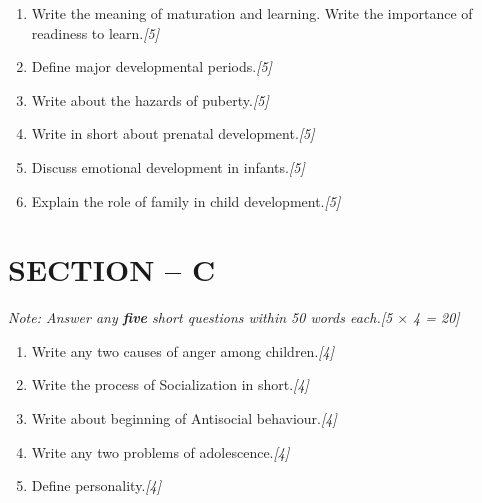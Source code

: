 \documentclass[11pt,a4paper]{article}
\newcommand{\pts}[1]{\hfill \textit{[#1]}}
\begin{document}
\begin{enumerate}[label=\textbf{\arabic*.},leftmargin=*,start=5,itemsep=8pt]

  \item Write the meaning of maturation and learning. Write the importance of readiness to learn.\pts{5}

  \item Define major developmental periods.\pts{5}

  \item Write about the hazards of puberty.\pts{5}

  \item Write in short about prenatal development.\pts{5}

  \item Discuss emotional development in infants.\pts{5}

  \item Explain the role of family in child development.\pts{5}

\end{enumerate}

\bigskip

\section*{SECTION -- C}
\noindent \textit{Note: Answer any \textbf{five} short questions within 50 words each.}\pts{5 $\times$ 4 = 20}

\begin{enumerate}[label=\textbf{\arabic*.},leftmargin=*,start=11,itemsep=6pt]

  \item Write any two causes of anger among children.\pts{4}

  \item Write the process of Socialization in short.\pts{4}

  \item Write about beginning of Antisocial behaviour.\pts{4}

  \item Write any two problems of adolescence.\pts{4}

  \item Define personality.\pts{4}

\end{enumerate}
\end{document}
